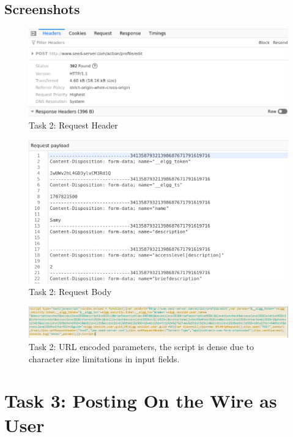 \documentclass[a4paper, 11pt, oneside]{article} %
\begin{document}
\subsection{Screenshots}
\begin{figure}[H]
    \includegraphics[width = 0.95\linewidth, center]{img/task2/2a.png}
    \caption{Task 2: Request Header}
    \label{fig:task2a}
\end{figure}
\begin{figure}[H]
    \includegraphics[width = 0.95\linewidth, center]{img/task2/2b.png}
    \caption{Task 2: Request Body}
    \label{fig:task2b}
\end{figure}
\begin{figure}[H]
    \includegraphics[width = 0.95\linewidth, center]{img/task2/2c.png}
    \caption{Task 2: URL encoded parameters, the script is dense due to character size limitations in input fields.}
    \label{fig:task2c}
\end{figure}

\section{Task 3: Posting On the Wire as User}
\end{document}

